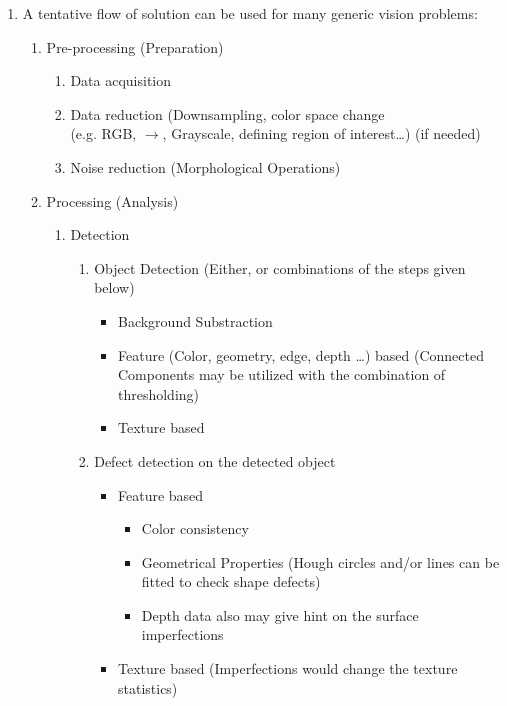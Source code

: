 \documentclass{article}
\begin{document}
\begin{enumerate}
	\item A tentative flow of solution can be used for many generic vision
	problems:
	\begin{enumerate}
		\item Pre-processing (Preparation)
		\begin{enumerate}
			\item Data acquisition
			\item Data reduction (Downsampling, color space change \\
			(e.g. RGB, $\to$, Grayscale, defining region of interest\ldots) (if needed)
			\item Noise reduction (Morphological Operations)
		\end{enumerate}
		
		\item Processing (Analysis)
		\begin{enumerate}
	    	\item Detection
	    	\begin{enumerate}
	    		\item Object Detection (Either, or combinations of the steps given below)
	    			\begin{itemize}
	    				\item Background Substraction
	    				\item Feature (Color, geometry, edge, depth \ldots) based (Connected
	    				Components may be utilized with the combination of thresholding)
	    				\item Texture based  				
	    			\end{itemize}
	    		\item Defect detection on the detected object
	    			\begin{itemize}
	    				\item Feature based
	    					\begin{itemize}
	    						\item Color consistency 
	    						\item Geometrical Properties (Hough circles and/or lines can be fitted to check shape defects)
	    						\item Depth data also may give hint on the surface imperfections
	    					\end{itemize}
	    				\item Texture based (Imperfections would change the texture	statistics)		
	    			\end{itemize}
	    	\end{enumerate}
		\end{enumerate}
	\end{enumerate}
\end{enumerate}
\pagebreak
\end{document}
